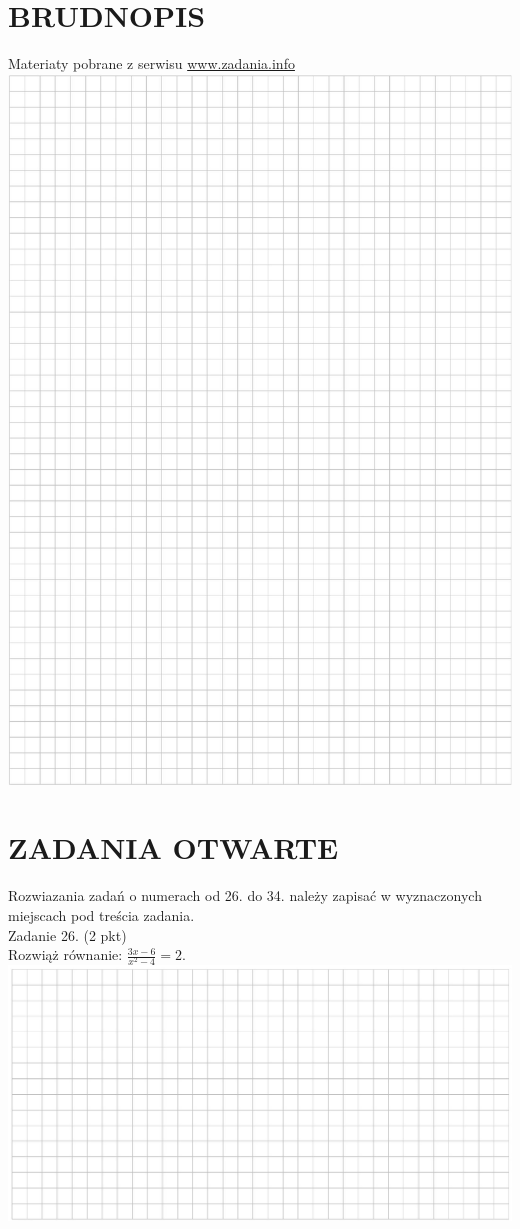 \documentclass[10pt]{article}
\begin{document}
\section*{BRUDNOPIS}
Materiaty pobrane z serwisu \href{http://www.zadania.info}{www.zadania.info}\\
\includegraphics[max width=\textwidth, center]{2024_11_21_b31e6de468170710de69g-09}

\section*{ZADANIA OTWARTE}
Rozwiazania zadań o numerach od 26. do 34. należy zapisać w wyznaczonych miejscach pod treścia zadania.\\
Zadanie 26. (2 pkt)\\
Rozwiąż równanie: \(\frac{3 x-6}{x^{2}-4}=2\).\\
\includegraphics[max width=\textwidth, center]{2024_11_21_b31e6de468170710de69g-10}
\end{document}
